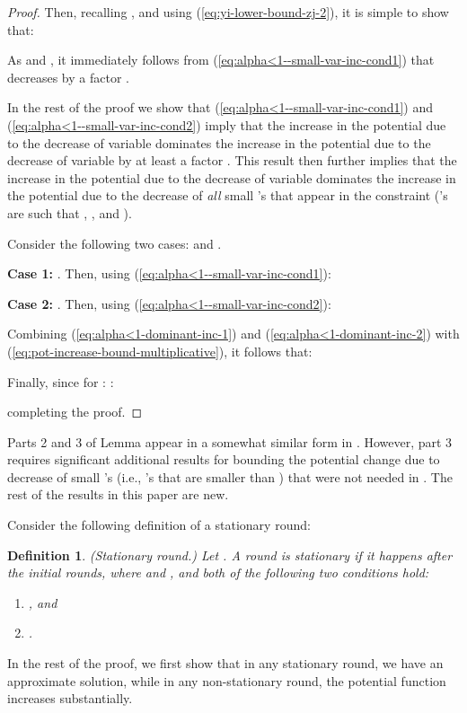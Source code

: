 \documentclass[11pt]{article}
\newtheorem{definition}[theorem]{Definition}
\begin{document}
\begin{proof}
Then, recalling , and using (\ref{eq:yi-lower-bound-zj-2}), it is simple to show that:

As  and , it immediately follows from (\ref{eq:alpha<1--small-var-inc-cond1}) that  decreases by a factor . 

In the rest of the proof we show that (\ref{eq:alpha<1--small-var-inc-cond1}) and (\ref{eq:alpha<1--small-var-inc-cond2}) imply that the increase in the potential due to the decrease of variable  dominates the increase in the potential due to the decrease of variable  by at least a factor . This result then further implies that the increase in the potential due to the decrease of variable  dominates the increase in the potential due to the decrease of \emph{all} small 's that appear in the constraint  ('s are such that , , and ).   

Consider the following two cases:  and .

\noindent\textbf{Case 1: }. Then, using (\ref{eq:alpha<1--small-var-inc-cond1}):

\noindent\textbf{Case 2: }. Then, using (\ref{eq:alpha<1--small-var-inc-cond2}):


Combining (\ref{eq:alpha<1-dominant-inc-1}) and (\ref{eq:alpha<1-dominant-inc-2}) with (\ref{eq:pot-increase-bound-multiplicative}), it follows that:

Finally, since for : :

completing the proof.
\end{proof}
Parts 2 and 3 of Lemma \cite{AwerbuchKhandekar2009} appear in a somewhat similar form in \cite{AwerbuchKhandekar2009}. However, part 3 requires significant additional results for bounding the potential change due to decrease of small 's (i.e., 's that are smaller than ) that were not needed in \cite{AwerbuchKhandekar2009}. The rest of the results in this paper are new.    

Consider the following definition of a stationary round:

\begin{definition}\label{def:alpha<1-stationary-round}
(Stationary round.) Let . A round is stationary if it happens after the initial  rounds, where  and , and both of the following two conditions hold:
\begin{enumerate}
\item , and
\item .
\end{enumerate}
\end{definition}

In the rest of the proof, we first show that in any stationary round, we have an approximate solution, while in any non-stationary round, the potential function increases substantially.
\end{document}
